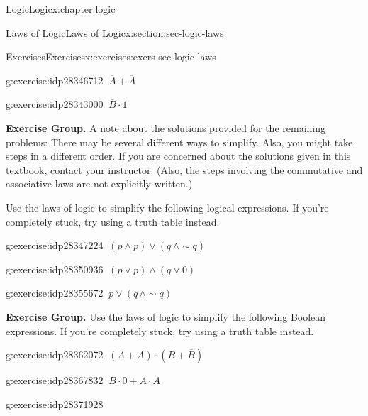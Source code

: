 \documentclass[twoside,10pt,]{book}
\numberwithin{equation}{section}
\begin{document}
\begin{chapterptx}{Logic}{}{Logic}{}{}{x:chapter:logic}
\begin{sectionptx}{Laws of Logic}{}{Laws of Logic}{}{}{x:section:sec-logic-laws}
\begin{exercises-subsection}{Exercises}{}{Exercises}{}{}{x:exercises:exers-sec-logic-laws}
\begin{exercisegroup}
\begin{divisionexerciseeg}{16}{}{}{g:exercise:idp28346712}
\(\ \overline{A}+\overline{A}\)\end{divisionexerciseeg}%
\begin{divisionexerciseeg}{17}{}{}{g:exercise:idp28343000}%
\(\ \overline{B}\cdot 1\)\end{divisionexerciseeg}%
\end{exercisegroup}
\par\medskip\noindent
\par\medskip\noindent%
\textbf{Exercise Group.}\space\space%
A note about the solutions provided for the remaining problems: There may be several different ways to simplify.  Also, you might take steps in a different order.  If you are concerned about the solutions given in this textbook, contact your instructor.  (Also, the steps involving the commutative and associative laws are not explicitly written.)%
\par
Use the laws of logic to simplify the following logical expressions.  If you're completely stuck, try using a truth table instead.%
\begin{exercisegroup}
\begin{divisionexerciseeg}{18}{}{}{g:exercise:idp28347224}%
\(\ (p{\wedge} p){\vee}(q\,{\wedge}\sim\!{q})\)\end{divisionexerciseeg}%
\begin{divisionexerciseeg}{19}{}{}{g:exercise:idp28350936}%
\(\ (p{\vee} p){\wedge} (q{\vee} 0)\)\end{divisionexerciseeg}%
\begin{divisionexerciseeg}{20}{}{}{g:exercise:idp28355672}%
\(\ p{\vee}(q\,{\wedge}\sim\!{q})\)\end{divisionexerciseeg}%
\end{exercisegroup}
\par\medskip\noindent
\par\medskip\noindent%
\textbf{Exercise Group.}\space\space%
Use the laws of logic to simplify the following Boolean expressions.  If you're completely stuck, try using a truth table instead.\begin{exercisegroup}
\begin{divisionexerciseeg}{21}{}{}{g:exercise:idp28362072}%
\(\ (A+A)\cdot(B+\overline{B})\)\end{divisionexerciseeg}%
\begin{divisionexerciseeg}{22}{}{}{g:exercise:idp28367832}%
\(\ B\cdot 0+A\cdot A\)\end{divisionexerciseeg}%
\begin{divisionexerciseeg}{23}{}{}{g:exercise:idp28371928}%

\end{divisionexerciseeg}
\end{exercisegroup}
\end{exercises-subsection}
\end{sectionptx}
\end{chapterptx}
\end{document}
